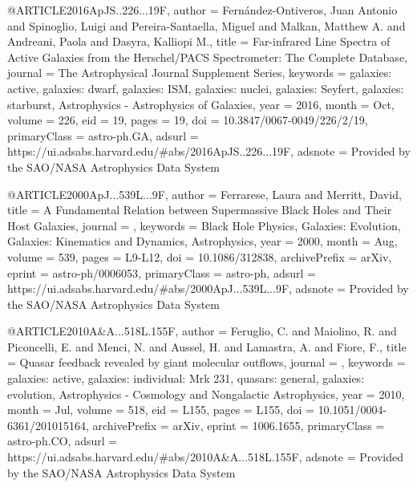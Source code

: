 \documentclass[longauth]{aa}
\begin{document}
@ARTICLE{2016ApJS..226...19F,
       author = {{Fern{\'a}ndez-Ontiveros}, Juan Antonio and {Spinoglio}, Luigi and {Pereira-Santaella}, Miguel and {Malkan}, Matthew A. and {Andreani}, Paola and {Dasyra}, Kalliopi M.},
        title = {Far-infrared Line Spectra of Active Galaxies from the Herschel/PACS Spectrometer: The Complete Database},
      journal = {The Astrophysical Journal Supplement Series},
     keywords = {galaxies: active, galaxies: dwarf, galaxies: ISM, galaxies: nuclei, galaxies: Seyfert, galaxies: starburst, Astrophysics - Astrophysics of Galaxies},
         year = 2016,
        month = Oct,
       volume = {226},
          eid = {19},
        pages = {19},
          doi = {10.3847/0067-0049/226/2/19},
 primaryClass = {astro-ph.GA},
       adsurl = {https://ui.adsabs.harvard.edu/#abs/2016ApJS..226...19F},
      adsnote = {Provided by the SAO/NASA Astrophysics Data System}
}

@ARTICLE{2000ApJ...539L...9F,
       author = {{Ferrarese}, Laura and {Merritt}, David},
        title = {A Fundamental Relation between Supermassive Black Holes and Their Host
        Galaxies},
      journal = {\apj},
     keywords = {Black Hole Physics, Galaxies: Evolution, Galaxies: Kinematics and
        Dynamics, Astrophysics},
         year = 2000,
        month = Aug,
       volume = {539},
        pages = {L9-L12},
          doi = {10.1086/312838},
archivePrefix = {arXiv},
       eprint = {astro-ph/0006053},
 primaryClass = {astro-ph},
       adsurl = {https://ui.adsabs.harvard.edu/#abs/2000ApJ...539L...9F},
      adsnote = {Provided by the SAO/NASA Astrophysics Data System}
}

@ARTICLE{2010A&A...518L.155F,
       author = {{Feruglio}, C. and {Maiolino}, R. and {Piconcelli}, E. and {Menci}, N. and {Aussel}, H. and {Lamastra}, A. and {Fiore}, F.},
        title = {Quasar feedback revealed by giant molecular outflows},
      journal = {\aap},
     keywords = {galaxies: active, galaxies: individual: Mrk 231, quasars: general,
        galaxies: evolution, Astrophysics - Cosmology and Nongalactic
        Astrophysics},
         year = 2010,
        month = Jul,
       volume = {518},
          eid = {L155},
        pages = {L155},
          doi = {10.1051/0004-6361/201015164},
archivePrefix = {arXiv},
       eprint = {1006.1655},
 primaryClass = {astro-ph.CO},
       adsurl = {https://ui.adsabs.harvard.edu/#abs/2010A&A...518L.155F},
      adsnote = {Provided by the SAO/NASA Astrophysics Data System}
}
\end{document}
